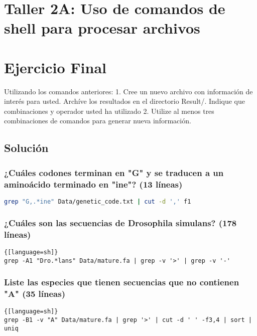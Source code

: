 \documentclass[10pt]{article}
\author{Diego Esteban Quintero Rey}
\begin{document}
\section{Taller 2A: Uso de comandos de shell para procesar archivos}

\section{Ejercicio Final}

Utilizando los comandos anteriores:
1. Cree un nuevo archivo con información de interés para usted. Archíve los resultados  en el directorio Result/. Indique que combinaciones y operador usted ha utilizado
2. Utilize al menos tres combinaciones de comandos para generar nueva información.

\subsection*{Solución}

\subsubsection*{¿Cuáles codones terminan en "G" y se traducen a un aminoácido terminado en "ine"? (13 líneas)}

\begin{lstlisting}[language=sh]
grep "G,.*ine" Data/genetic_code.txt | cut -d ',' f1
\end{lstlisting}

\subsubsection*{¿Cuáles son las secuencias de Drosophila simulans? (178 líneas)}

\begin{lstlisting}{[language=sh]}
grep -A1 "Dro.*lans" Data/mature.fa | grep -v '>' | grep -v '-' 
\end{lstlisting}

\subsubsection*{Liste las especies que tienen secuencias que no contienen "A" (35 líneas)}

\begin{lstlisting}{[language=sh]}
grep -B1 -v "A" Data/mature.fa | grep '>' | cut -d ' ' -f3,4 | sort | uniq
\end{lstlisting}
\end{document}
